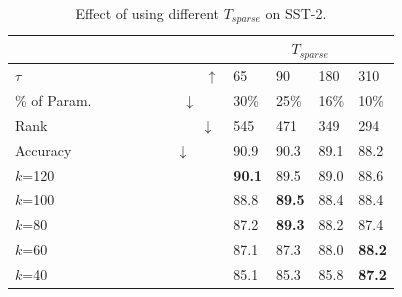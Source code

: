 \begin{table}[t]
	\centering
	\scriptsize
	\begin{tabular}{l|llll}
		\toprule
		&	\multicolumn{4}{c}{$T_{sparse}$} \\
		\midrule
		\multicolumn{1}{l|}{$\tau$~~~~~~~~~~~~~~~~~~~~~~~~$~~~~~\uparrow$}           &65  &90  &180           &310                      \\
				 \multicolumn{1}{l|}{\% of Param.~~~~~~~~~~~~~$\downarrow$}           & 30\% & 25\% & 16\%          & 10\%                     \\
		\multicolumn{1}{l|}{Rank~~~~~~~~~~~~~~~~~~~~~$~~\downarrow$}               &545   &471   &349            &294                        \\
		\multicolumn{1}{l|}{Accuracy~~~~~~~~~~~~~~$~~\downarrow$}           & 90.9 & 90.3 & 89.1          & 88.2                     \\

		\midrule
		\multicolumn{1}{l|}{$k$=120}       &\textbf{90.1}  &89.5  &89.0           &88.6                      \\
		\multicolumn{1}{l|}{$k$=100}        &88.8  &\textbf{89.5}  &88.4           &88.4                      \\
		\multicolumn{1}{l|}{$k$=80}                  &87.2  &\textbf{89.3}  &88.2  &87.4                      \\
		\multicolumn{1}{l|}{$k$=60}                  &87.1  &87.3  &88.0           &\textbf{88.2}             \\
		\multicolumn{1}{l|}{$k$=40}                  &85.1  &85.3  &85.8           &\textbf{87.2}             \\
		\bottomrule
	\end{tabular}
	\caption{Effect of using different $T_{sparse}$ on SST-2.
}
	\label{table:diffsparse}
\end{table}


